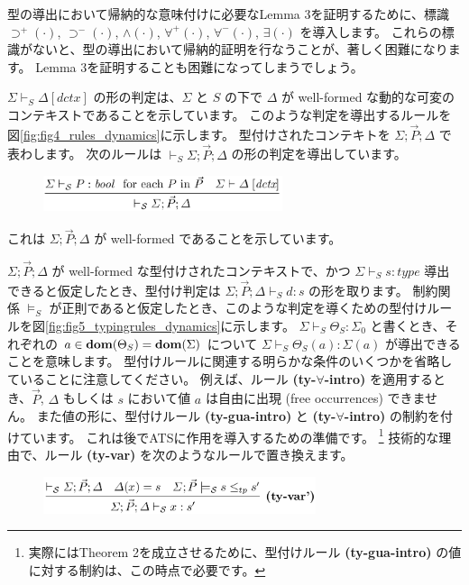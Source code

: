 \documentclass[submit,techreq,noauthor,onecolumn]{ipsj}
\begin{document}
型の導出において帰納的な意味付けに必要なLemma 3を証明するために、標識 $\supset^+(\cdot)$, $\supset^-(\cdot)$, $\wedge(\cdot)$, $\forall^+(\cdot)$, $\forall^-(\cdot)$, $\exists(\cdot)$ を導入します。
これらの標識がないと、型の導出において帰納的証明を行なうことが、著しく困難になります。
Lemma 3を証明することも困難になってしまうでしょう。

$\Sigma \vdash_S \Delta [dctx]$ の形の判定は、$\Sigma$ と $S$ の下で $\Delta$ が well-formed な動的な可変のコンテキストであることを示しています。
このような判定を導出するルールを図\ref{fig:fig4_rules_dynamics}に示します。
型付けされたコンテキトを $\Sigma; \vec{P}; \Delta$ で表わします。
次のルールは $\vdash_S \Sigma; \vec{P}; \Delta$ の形の判定を導出しています。

\begin{figure}[h]
\centering
\includegraphics[width=7cm]{img/infig22_rule_deriving.png}
\end{figure}

\noindent これは $\Sigma; \vec{P}; \Delta$ が well-formed であることを示しています。

$\Sigma; \vec{P}; \Delta$ が well-formed な型付けされたコンテキストで、かつ $\Sigma \vdash_S s:type$ 導出できると仮定したとき、型付け判定は $\Sigma; \vec{P}; \Delta \vdash_S d:s$ の形を取ります。
制約関係 $\models_S$ が正則であると仮定したとき、このような判定を導くための型付けルールを図\ref{fig:fig5_typingrules_dynamics}に示します。
$\Sigma \vdash_S \Theta_S : \Sigma_0$ と書くとき、それぞれの $a \in {\bf dom}(\Theta_S) = {\bf dom}(\Sigma)$ について $\Sigma \vdash_S \Theta_S(a) : \Sigma(a)$ が導出できることを意味します。
型付けルールに関連する明らかな条件のいくつかを省略していることに注意してください。
例えば、ルール {\bf(ty-$\forall$-intro)} を適用するとき、$\vec{P}$, $\Delta$ もしくは $s$ において値 $a$ は自由に出現 (free occurrences) できません。
また値の形に、型付けルール {\bf (ty-gua-intro)} と {\bf (ty-$\forall$-intro)} の制約を付けています。
これは後でATSに作用を導入するための準備です。
\footnote{実際にはTheorem 2を成立させるために、型付けルール {\bf (ty-gua-intro)} の値に対する制約は、この時点で必要です。}
技術的な理由で、ルール {\bf (ty-var)} を次のようなルールで置き換えます。

\begin{figure}[h]
\centering
\includegraphics[width=8cm]{img/infig22_ty-var.png}
\end{figure}
\end{document}
